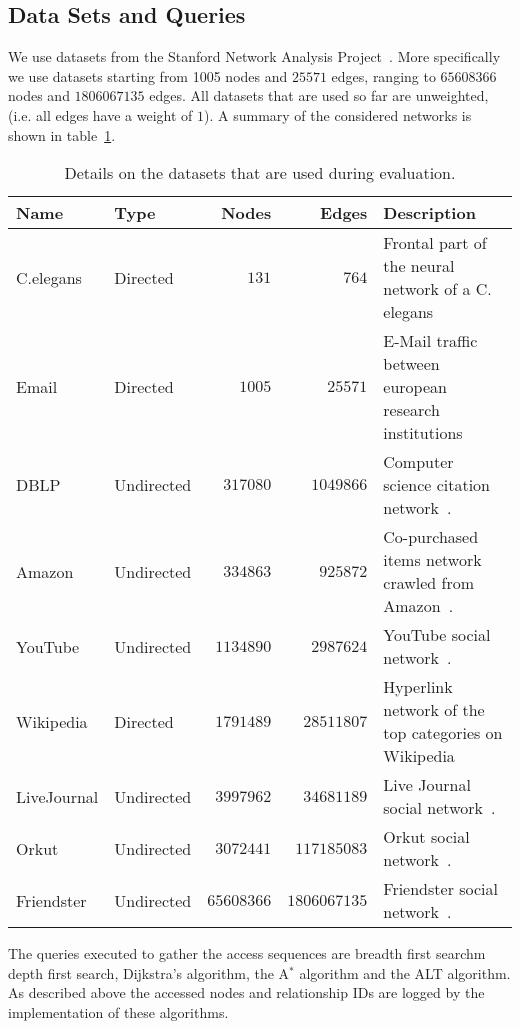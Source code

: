     \subsection*{Data Sets and Queries}
        We use datasets from the Stanford Network Analysis Project~\autocite{snap}.
        More specifically we use datasets starting from 1005 nodes and $25571$ edges, ranging to $65608366$ nodes and $1806067135$ edges.
        All datasets that are used so far are unweighted, (i.e. all edges have a weight of $1$).
        A summary of the considered networks is shown in table~\ref{datasets}.
        \begin{table}
        \begin{center}
            \begin{tabular}[c]{p{2.3cm} l r r p{6cm}} \toprule
                Name & Type & Nodes & Edges & Description \\ \midrule
                 C.elegans & Directed & $131$ & $764$ & Frontal part of the neural network of a C. elegans~\autocite{celegans} \\ [0.8cm]
                 Email & Directed & $1005$ & $25571$ & E-Mail traffic between european research institutions~\autocite{email} \\ [0.8cm]
                 DBLP & Undirected & $317080$ & $1049866$ & Computer science citation network~\autocite{lj}. \\ [0.8cm]
                 Amazon & Undirected & $334863$ & $925872$ & Co-purchased items network crawled from Amazon~\autocite{lj}. \\ [0.8cm]
                 YouTube & Undirected & $1134890$ & $2987624$ & YouTube social network~\autocite{mislove}. \\ [0.5cm]
                 Wikipedia & Directed & $1791489$ & $28511807$ & Hyperlink network of the top categories on Wikipedia~\autocite{wiki} \\ [0.8cm]
                LiveJournal & Undirected & $3997962$ & $34681189$ & Live Journal social network~\autocite{lj}. \\ [0.8cm]
                Orkut & Undirected & $3072441$ & $117185083$ & Orkut social network~\autocite{mislove}. \\ [0.8cm]
                Friendster & Undirected & $65608366$ & $1806067135$ & Friendster social network~\autocite{friendster}. \\ \bottomrule
            \end{tabular}
            \end{center}
            \caption{Details on the datasets that are used during evaluation.}
            \label{datasets}
        \end{table}
        The queries executed to gather the access sequences are breadth first searchm depth first search, Dijkstra's algorithm, the A$^*$ algorithm and the ALT algorithm.
        As described above the accessed nodes and relationship IDs are logged by the implementation of these algorithms.

